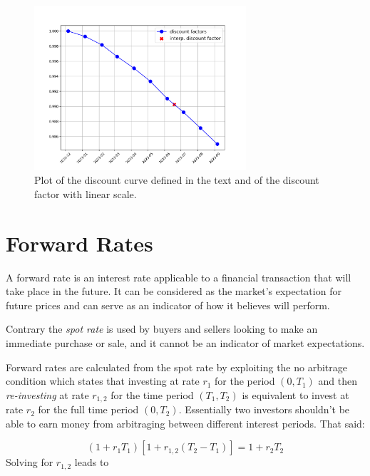 \begin{figure}[htb]
	\centering
	\includegraphics[width=0.7\textwidth]{figures/linear_discount_curve}
	\caption{Plot of the discount curve defined in the text and of the discount factor with linear scale.}
	\label{fig:linear_discount_curve}
\end{figure}

\section{Forward Rates}
\label{calculating-forward-rates}
A forward rate is an interest rate applicable to a financial transaction that will take place in the future. It can be considered as the market's expectation for future prices and can serve as an indicator of how it believes will perform.

Contrary the \emph{spot rate} is used by buyers and sellers looking to make an immediate purchase or sale, and it cannot be an indicator of market expectations.

Forward rates are calculated from the spot rate by exploiting the no arbitrage condition which states that investing at rate $r_1$ for the period $(0, T_1)$ and then \emph{re-investing} at rate $r_{1,2}$ for the time period $(T_1, T_2)$ is equivalent to invest at rate $r_2$ for the full time period $(0, T_2)$. Essentially two investors shouldn't be able to earn money from arbitraging between different interest periods. That said:

\begin{equation}
(1+r_1 T_1)[1+r_{1,2}(T_2 - T_1)] = 1 + r_2 T_2
\label{eq:no_arbitrage_r}
\end{equation}
Solving for $r_{1,2}$ leads to

